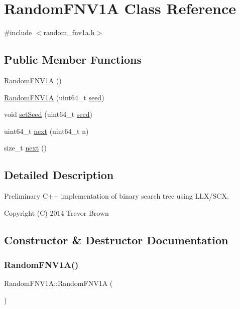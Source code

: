 \hypertarget{classRandomFNV1A}{}\section{Random\+F\+N\+V1A Class Reference}
\label{classRandomFNV1A}


{\ttfamily \#include $<$random\+\_\+fnv1a.\+h$>$}

\subsection*{Public Member Functions}
\begin{DoxyCompactItemize}
\item 
\hyperlink{classRandomFNV1A_ad6e2947a9daa7f007747018ac4797bb6}{Random\+F\+N\+V1A} ()
\item 
\hyperlink{classRandomFNV1A_a1f3ca9c2044fed23fd88418ad12004bd}{Random\+F\+N\+V1A} (uint64\+\_\+t \hyperlink{classRandomFNV1A_acf505335861440a14ee0b7710586b5c1}{seed})
\item 
void \hyperlink{classRandomFNV1A_a8fa32c70622235889cde300c7b8adb10}{set\+Seed} (uint64\+\_\+t \hyperlink{classRandomFNV1A_acf505335861440a14ee0b7710586b5c1}{seed})
\item 
uint64\+\_\+t \hyperlink{classRandomFNV1A_a4b38851f3bd4275634ba1d1492739b16}{next} (uint64\+\_\+t n)
\item 
size\+\_\+t \hyperlink{classRandomFNV1A_a2b331d84c37f8091bd69260d87c9765b}{next} ()
\end{DoxyCompactItemize}


\subsection{Detailed Description}
Preliminary C++ implementation of binary search tree using L\+L\+X/\+S\+CX.

Copyright (C) 2014 Trevor Brown 

\subsection{Constructor \& Destructor Documentation}
\mbox{\label{classRandomFNV1A_ad6e2947a9daa7f007747018ac4797bb6}} 
\subsubsection{\texorpdfstring{Random\+F\+N\+V1\+A()}{RandomFNV1A()}\hspace{0.1cm}{\footnotesize\ttfamily [1/2]}}
{\footnotesize\ttfamily Random\+F\+N\+V1\+A\+::\+Random\+F\+N\+V1A (\begin{DoxyParamCaption}{ }\end{DoxyParamCaption})\hspace{0.3cm}{\ttfamily [inline]}}

